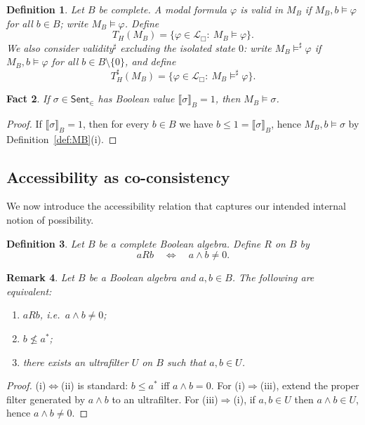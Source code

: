 \documentclass[10pt,a4paper]{amsart}
\newtheorem{definition}{Definition}[section]
\newtheorem{remark}[definition]{Remark}
\newtheorem{fact}[definition]{Fact}
\newcommand{\Sent}{\mathsf{Sent}}
\newcommand{\Lbox}{\mathcal L_{\Box}} %
\newcommand{\val}[1]{\llbracket #1\rrbracket_B}
\begin{document}
\begin{definition}\label{def:theories}
Let $B$ be complete.
A modal formula $\varphi$ is \emph{valid in $M_B$} if $M_B,b\models\varphi$ for all $b\in B$; write $M_B\models\varphi$.
Define
\[
T_H(M_B)=\{\varphi\in\Lbox:\ M_B\models\varphi\}.
\]
We also consider \emph{validity}$^\sharp$ excluding the isolated state $0$: write $M_B\models^\sharp\varphi$ if
$M_B,b\models\varphi$ for all $b\in B\setminus\{0\}$, and define
\[
T_H^\sharp(M_B)=\{\varphi\in\Lbox:\ M_B\models^\sharp\varphi\}.
\]
\end{definition}

\begin{fact}\label{fact:zfc-sentences}
If $\sigma\in\Sent_{\in}$ has Boolean value $\val{\sigma}=1$, then $M_B\models \sigma$.
\end{fact}

\begin{proof}
If $\val{\sigma}=1$, then for every $b\in B$ we have $b\le 1=\val{\sigma}$, hence $M_B,b\models\sigma$ by
Definition~\ref{def:MB}(i).
\end{proof}

\subsection{Accessibility as co-consistency}\label{subsec:coconsistency}

We now introduce the accessibility relation that captures our intended internal notion of possibility.

\begin{definition}\label{def:R}
Let $B$ be a complete Boolean algebra. Define $R$ on $B$ by
\[
aRb \quad\Longleftrightarrow\quad a\wedge b\neq 0.
\]
\end{definition}

\begin{remark}\label{rem:R-equivalences}
Let $B$ be a Boolean algebra and $a,b\in B$. The following are equivalent:
\begin{enumerate}[label=(\roman*)]
\item $aRb$, i.e.\ $a\wedge b\neq 0$;
\item $b\not\le a^{\ast}$;
\item there exists an ultrafilter $U$ on $B$ such that $a, b\in U$.
\end{enumerate}
\end{remark}

\begin{proof}
(i)$\Leftrightarrow$(ii) is standard: $b\le a^\ast$ iff $a\wedge b=0$.
For (i)$\Rightarrow$(iii), extend the proper filter generated by $a\wedge b$ to an ultrafilter.
For (iii)$\Rightarrow$(i), if $a,b\in U$ then $a\wedge b\in U$, hence $a\wedge b\neq 0$.
\end{proof}
\end{document}
